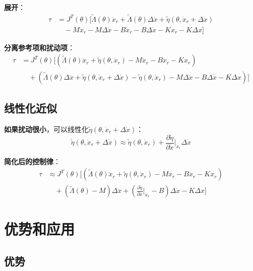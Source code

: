 \documentclass[12pt,a4paper]{article}
\begin{document}
\textbf{展开}：
\begin{align}
\tau &= J^T(\theta)\Big[\tilde{\Lambda}(\theta)\ddot{x}_r + \tilde{\Lambda}(\theta)\Delta \ddot{x} + \tilde{\eta}(\theta, \dot{x}_r + \Delta \dot{x}) \\
&\quad - M\ddot{x}_r - M\Delta \ddot{x} - B\dot{x}_r - B\Delta \dot{x} - Kx_r - K\Delta x\Big]
\end{align}

\textbf{分离参考项和扰动项}：
\begin{align}
\tau &= J^T(\theta)\Big[(\tilde{\Lambda}(\theta)\ddot{x}_r + \tilde{\eta}(\theta, \dot{x}_r) - M\ddot{x}_r - B\dot{x}_r - Kx_r) \\
&\quad + (\tilde{\Lambda}(\theta)\Delta \ddot{x} + \tilde{\eta}(\theta, \dot{x}_r + \Delta \dot{x}) - \tilde{\eta}(\theta, \dot{x}_r) - M\Delta \ddot{x} - B\Delta \dot{x} - K\Delta x)\Big]
\end{align}

\subsection{线性化近似}

\textbf{如果扰动很小}，可以线性化$\tilde{\eta}(\theta, \dot{x}_r + \Delta \dot{x})$：
\begin{equation}
\tilde{\eta}(\theta, \dot{x}_r + \Delta \dot{x}) \approx \tilde{\eta}(\theta, \dot{x}_r) + \frac{\partial \tilde{\eta}}{\partial \dot{x}}\Big|_{\dot{x}_r} \Delta \dot{x}
\end{equation}

\textbf{简化后的控制律}：
\begin{align}
\tau &\approx J^T(\theta)\Big[(\tilde{\Lambda}(\theta)\ddot{x}_r + \tilde{\eta}(\theta, \dot{x}_r) - M\ddot{x}_r - B\dot{x}_r - Kx_r) \\
&\quad + (\tilde{\Lambda}(\theta) - M)\Delta \ddot{x} + \left(\frac{\partial \tilde{\eta}}{\partial \dot{x}}\Big|_{\dot{x}_r} - B\right)\Delta \dot{x} - K\Delta x\Big]
\end{align}

\section{优势和应用}

\subsection{优势}
\end{document}
